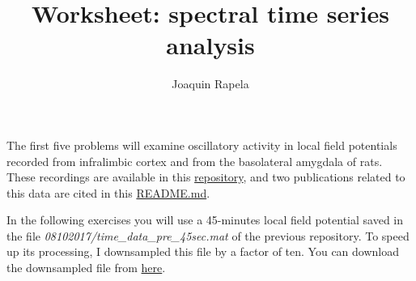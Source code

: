 \documentclass[12pt]{article}
\title{Worksheet: spectral time series analysis}
\author{Joaquin Rapela}
\begin{document}
\maketitle

The first five problems will examine oscillatory activity in local field
potentials recorded from infralimbic cortex and from the basolateral amygdala
of rats. These recordings are available in this
\href{https://github.com/tne-lab/cl-example-data}{repository}, and two
publications related to this data are cited in this
\href{https://github.com/tne-lab/cl-example-data/README.md}{README.md}.

In the following exercises you will use a 45-minutes local field potential
saved in the file
\emph{08102017/time\_data\_pre\_45sec.mat}
of the previous repository.
To speed up its processing, I downsampled this file
by a factor of ten.
You can download the downsampled file from
\href{https://www.gatsby.ucl.ac.uk/~rapela/statNeuro/2025/lectures/03_spectralTimeSeriesAnalysis/data/time_data_pre_45sec_ds10_v6.mat}{here}.
\end{document}
